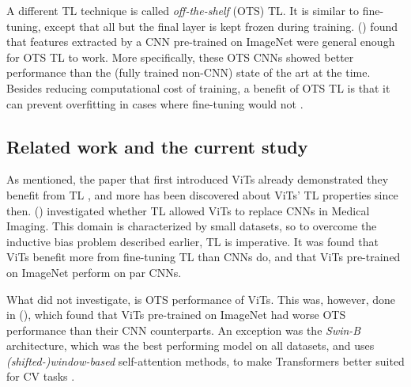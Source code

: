 
A different TL technique is called \textit{off-the-shelf} (OTS) TL. It is similar to fine-tuning, except that all but the final layer is kept frozen during training. \citeauthor{sharif2014cnn} (\citeyear{sharif2014cnn}) found that features extracted by a CNN pre-trained on ImageNet were general enough for OTS TL to work. More specifically, these OTS CNNs showed better performance than the (fully trained non-CNN) state of the art at the time. Besides reducing computational cost of training, a benefit of OTS TL is that it can prevent overfitting in cases where fine-tuning would not \citep{yosinski2014transferable}.


\subsection{Related work and the current study}
As mentioned, the paper that first introduced ViTs already demonstrated they benefit from TL \citep{dosovitskiy2020image}, and more has been discovered about ViTs' TL properties since then. \citeauthor{matsoukas2021time} (\citeyear{matsoukas2021time}) investigated whether TL allowed ViTs to replace CNNs in Medical Imaging. This domain is characterized by small datasets, so to overcome the inductive bias problem described earlier, TL is imperative. It was found that ViTs benefit more from fine-tuning TL than CNNs do, and that ViTs pre-trained on ImageNet perform on par CNNs.

What \citeauthor{matsoukas2021time} did not investigate, is OTS performance of ViTs. This was, however, done in \citeauthor{zhou2021convnets} (\citeyear{zhou2021convnets}), which found that ViTs pre-trained on ImageNet had worse OTS performance than their CNN counterparts. An exception was the \textit{Swin-B} architecture, which was the best performing model on all datasets, and uses \textit{(shifted-)window-based} self-attention methods, to make Transformers better suited for CV tasks \citep{liu2021swin}.

